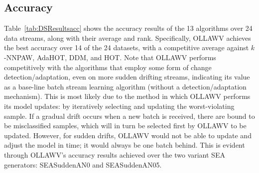 \documentclass[reqno]{vcuthesis}
\numberwithin{equation}{chapter}
\begin{document}
\subsection{Accuracy}
Table~\ref{tab:DSResultsacc} shows the accuracy results of the 13 algorithms over 24 data streams, along with their average and rank. Specifically, OLLAWV achieves the best accuracy over 14 of the 24 datasets, with a competitive average against $k$-NNPAW, AdaHOT, DDM, and HOT. Note that OLLAWV performs competitively with the algorithms that employ some form of change detection/adaptation, even on more sudden drifting streams, indicating its value as a base-line batch stream learning algorithm (without a detection/adaptation mechanism). This is most likely due to the method in which OLLAWV performs its model updates: by iteratively selecting and updating the worst-violating sample. If a gradual drift occurs when a new batch is received, there are bound to be misclassified samples, which will in turn be selected first by OLLAWV to be updated. However, for sudden drifts, OLLAWV would not be able to update and adjust the model in time; it would always be one batch behind. This is evident through OLLAWV's accuracy results achieved over the two variant SEA generators: SEASuddenAN0 and SEASuddenAN05.
\end{document}
